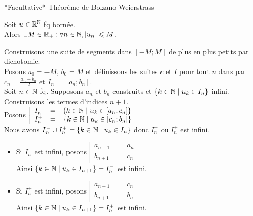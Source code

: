 \documentclass{article}
\renewenvironment{question_kholle}[2][ ]
{
	\subsection{\texorpdfstring{#2}{}}
	\notblank{#1}
	{
		\noindent #1
		\bigbreak
	}
	{}
	\begin{proof}
}
{
	\end{proof}
}
\begin{document}
	\begin{question_kholle}
		{*Facultative* Théorème de Bolzano-Weierstrass}

		Soit $u \in \mathbb R^{\mathbb N}$ fq bornée. \\
		Alors $\exists M \in \mathbb R_+ : \forall n \in \mathbb N, |u_n| \leqslant M$.

		Construisons une suite de segments dans $[-M;M]$ de plus en plus petits par dichotomie. \\
		Posons $a_0 = -M$, $b_0 = M$ et définissons les suites $c$ et $I$ pour tout $n$ dans \N par $c_n = \frac{a_n + b_n}{2}$ et $I_n = [a_n;b_n]$. \\
		
		\noindent Soit $n\in \mathbb N$ fq.
		Supposons $a_n \text{ et } b_n$ construits et $\{ k \in \mathbb N \;|\; u_k \in I_n \}$ infini.
		Construisons les termes d'indices $n+1$. \\
		Posons $\left| \begin{array}{lcr}
			I_n^- &=& \{ k \in \mathbb N \;|\; u_k \in [a_n;c_n] \} \\
			I_n^+ &=& \{ k \in \mathbb N \;|\; u_k \in [c_n;b_n] \} \\
		\end{array} \right.$ \\
		Nous avons $I_n^- \cup I_n^+ = \{ k \in \mathbb N \;|\; u_k \in I_n \}$ donc $I_n^-$ ou $I_n^+$ est infini.

		\begin{itemize}
			\item Si $I_n^-$ est infini, posons $\left| \begin{array}{lcl}
				a_{n+1} &=& a_n \\
				b_{n+1} &=& c_n
			\end{array} \right.$ \\
			Ainsi $\{ k \in \mathbb N \;|\; u_k \in I_{n+1} \} = I_n^-$ est infini.
			\item Si $I_n^+$ est infini, posons $\left| \begin{array}{lcl}
				a_{n+1} &=& c_n \\
				b_{n+1} &=& b_n
			\end{array} \right.$ \\
			Ainsi $\{ k \in \mathbb N \;|\; u_k \in I_{n+1} \} = I_n^+$ est infini.
		\end{itemize}
		\bigbreak


\end{question_kholle}
\end{document}
